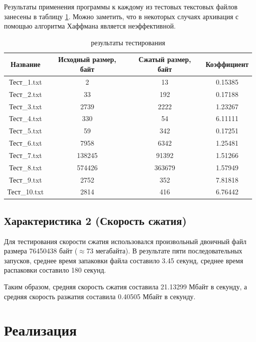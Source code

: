\documentclass[a4paper,oneside]{article}
\theoremstyle{definition}
\begin{document}
Результаты применения программы к каждому из тестовых текстовых файлов занесены
в таблицу \ref{tbl:results}. Можно заметить, что в некоторых случаях архивация с
помощью алгоритма Хаффмана является неэффективной.

\begin{table}[H]
  \small
  \centering
  \begin{tabular}{|c|c|c|c|}
    \hline
    Название     & Исходный размер, байт & Сжатый размер, байт & Коэффициент \\ \hline \hline
    Тест\_1.txt  & 2           & 13          & 0.15385   \\ \hline
    Тест\_2.txt  & 33          & 192         & 0.17188   \\ \hline
    Тест\_3.txt  & 2739        & 2222        & 1.23267   \\ \hline
    Тест\_4.txt  & 330         & 54          & 6.11111   \\ \hline
    Тест\_5.txt  & 59          & 342         & 0.17251   \\ \hline
    Тест\_6.txt  & 7958        & 6342        & 1.25481   \\ \hline
    Тест\_7.txt  & 138245      & 91392       & 1.51266   \\ \hline
    Тест\_8.txt  & 574426      & 363679      & 1.57949   \\ \hline
    Тест\_9.txt  & 2752        & 352         & 7.81818   \\ \hline
    Тест\_10.txt & 2814        & 416         & 6.76442   \\ \hline
  \end{tabular}
  \caption{результаты тестирования}
  \label{tbl:results}
\end{table}

\subsection{Характеристика 2 (Скорость сжатия)}

Для тестирования скорости сжатия использовался произвольный двоичный
файл размера 76450438 байт ($\approx$73 мегабайта). В результате пяти
последовательных запусков, среднее время запаковки файла составило 3.45
секунд, среднее время распаковки составило 180 секунд.

Таким образом, средняя скорость сжатия составила 21.13299 Мбайт в секунду, а
средняя скорость разжатия составила 0.40505 Мбайт в секунду.


\section{Реализация}
\end{document}
